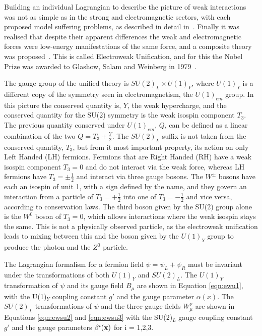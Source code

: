 Building an individual Lagrangian to describe the picture of weak interactions was not as simple as in the strong and electromagnetic sectors, with each proposed model suffering problems, as described in detail in~\cite{HerreroSM}. Finally it was realised that despite their apparent differences the weak and electromagnetic forces were low-energy manifestations of the same force, and a composite theory was proposed~\cite{Glashow}. This is called Electroweak Unification, and for this the Nobel Prize was awarded to Glashow, Salam and Weinberg in 1979~\cite{Breaking}. 

The gauge group of the unified theory is $SU(2)_{L} \times U(1)_{Y}$, where $U(1)_{Y}$ is a different copy of the symmetry seen in electromagnetism, the $U(1)_{em}$ group. In this picture the conserved quantity is, $Y$, the weak hypercharge, and the conserved quantity for the SU(2) symmetry is the weak isospin component $T_{3}$. The previous quantity conserved under $U(1)_{em}$, $Q$, can be defined as a linear combination of the two $Q = T_{3} + \frac{Y}{2}$.  The $SU(2)_{L}$ suffix is not taken from the conserved quantity, $T_{3}$, but from it most important property, its action on only Left Handed (LH) fermions. Fermions that are Right Handed (RH) have a weak isospin component $T_{3} = 0$ and do not interact via the weak force, whereas LH fermions have $T_{3} =  \pm \frac{1}{2}$ and interact via three gauge bosons. The $W^{\pm}$ bosons have each an isospin of unit 1, with a sign defined by the name, and they govern an interaction from a particle of $T_{3}=+\frac{1}{2}$ into one of $T_{3}=-\frac{1}{2}$ and vice versa, according to conservation laws. The third boson given by the SU(2) group alone is the $W^{0}$ boson of $T_{3}=0$, which allows interactions where the weak isospin stays the same. This is not a physically observed particle, as the electroweak unification leads to mixing between this and the boson given by the $U(1)_{Y}$ group to produce the photon and the $Z^{0}$ particle.


The Lagrangian formalism for a fermion field $\psi = \psi_{L} + \psi_{R}$ must be invariant under the transformations of both $U(1)_{Y}$ and $SU(2)_{L}$. The $U(1)_{Y}$ transformation of $\psi$ and its gauge field $B_{\mu}$ are shown in Equation \ref{eqn:ewu1}, with the U(1)$_{Y}$ coupling constant $g'$ and the gauge parameter $\alpha(x)$. The $SU(2)_{L}$ transformations of $\psi$ and the three gauge fields $W^{\nu}_{\mu}$ are shown in Equations \ref{eqn:ewsu2} and \ref{eqn:ewsu3} with the SU(2)$_{L}$ gauge coupling constant $g'$ and the gauge parameters $\beta^{i}(\mathbf{x})$ for i = 1,2,3.

